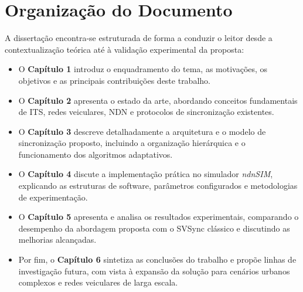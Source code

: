 \section{Organização do Documento}
\label{sec:organizacao_documento}

A dissertação encontra-se estruturada de forma a conduzir o leitor desde a contextualização teórica até à validação experimental da proposta:

\begin{itemize}
    \item O \textbf{Capítulo 1} introduz o enquadramento do tema, as motivações, os objetivos e as principais contribuições deste trabalho.  
    \item O \textbf{Capítulo 2} apresenta o estado da arte, abordando conceitos fundamentais de \gls{ITS}, redes veiculares, \gls{NDN} e protocolos de sincronização existentes.  
    \item O \textbf{Capítulo 3} descreve detalhadamente a arquitetura e o modelo de sincronização proposto, incluindo a organização hierárquica e o funcionamento dos algoritmos adaptativos.  
    \item O \textbf{Capítulo 4} discute a implementação prática no simulador \textit{ndnSIM}, explicando as estruturas de software, parâmetros configurados e metodologias de experimentação.  
    \item O \textbf{Capítulo 5} apresenta e analisa os resultados experimentais, comparando o desempenho da abordagem proposta com o \gls{SVSync} clássico e discutindo as melhorias alcançadas.  
    \item Por fim, o \textbf{Capítulo 6} sintetiza as conclusões do trabalho e propõe linhas de investigação futura, com vista à expansão da solução para cenários urbanos complexos e redes veiculares de larga escala.  
\end{itemize}


